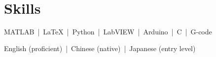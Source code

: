 \documentclass[letterpaper,11pt]{article}
\begin{document}
\section{Skills}
\SkillList    
      {MATLAB~|~\LaTeX~|~Python~|~LabVIEW~|~Arduino~|~C~|~G-code}
    
    

      {English (proficient)~|~Chinese (native)~|~Japanese (entry level)~}
    
\SkillListEnd


      

    

\newcommand{\ExpList}{\begin{itemize}[leftmargin=0.00in]}
\newcommand{\ExpListEnd}{\end{itemize}\vspace{-5pt}}

\newcommand{\ExpSubList}{\begin{itemize}[leftmargin=0.25in]}
\newcommand{\ExpSubListEnd}{\end{itemize}\vspace{-8pt}}


\newcommand{\ExpRole}[4]{
  \vspace{0pt}\item[]
    \begin{tabular*}{1\textwidth}[t]{l@{\extracolsep{\fill}}r}
      \textbf{#1} & #2 \\
      \textit{#3} & \textit{\small #4} \\
    \end{tabular*}\vspace{-8pt}
}
\end{document}
